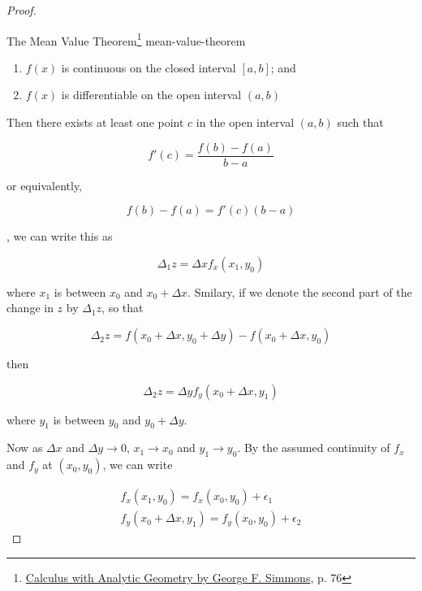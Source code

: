 \begin{proof}
{\begin{Theorem}{
            The Mean Value Theorem\footnote{\href{https://trello.com/c/byu9Pyy8}{Calculus with Analytic Geometry by George F. Simmons}, p. 76}
        }{mean-value-theorem}
            \begin{enumerate}
                \item $f(x)$ is continuous on the closed interval $[a, b]$; and
                \item $f(x)$ is differentiable on the open interval $(a, b)$
            \end{enumerate}

            Then there exists at least one point $c$ in the open interval $(a, b)$ such that

            \[
                f'(c) = \frac{f(b) - f(a)}{b - a}
            \]

            or equivalently,

            \[
                f(b) - f(a) = f'(c)(b - a)
            \]
        \end{Theorem}
    }, we can write this as

    \begin{equation}\label{eq:first-change-z-mean-val-theo}
    \Delta_1 z = \Delta x f_x(x_1, y_0)
    \end{equation}

    where $x_1$ is between $x_0$ and $x_0 + \Delta x$. Smilary, if we denote the second part of the change in $z$ by
    $\Delta_1 z$, so that

    \begin{equation}
        \Delta_2 z = f(x_0 + \Delta x, y_0 + \Delta y) - f(x_0 + \Delta x, y_0)
    \end{equation}

    then

    \begin{equation}\label{eq:second-change-z-mean-val-theo}
    \Delta_2 z = \Delta y f_y(x_0 + \Delta x, y_1)
    \end{equation}

    where $y_1$ is between $y_0$ and $y_0 + \Delta y$.

    Now as $\Delta x$ and $\Delta y \rightarrow 0$, $x_1 \rightarrow x_0$ and $y_1 \rightarrow y_0$. By the assumed
    continuity of $f_x$ and $f_y$ at $(x_0, y_0)$, we can write

    \begin{align}
        f_x(x_1, y_0) = f_x(x_0, y_0) + \epsilon_1 \label{eq:first-change-z-epsilon} \\
        f_y(x_0 + \Delta x, y_1) = f_y(x_0, y_0) + \epsilon_2 \label{eq:second-change-z-epsilon}
    \end{align}


\end{proof}

